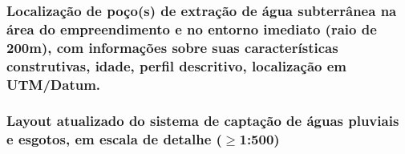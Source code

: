\subsubsection{Localização de poço(s) de extração de água subterrânea na 
área do empreendimento e no entorno imediato (raio de 
200m), com informações sobre suas características 
construtivas, idade, perfil descritivo, localização em 
UTM/Datum.}

\subsubsection{Layout atualizado do sistema de captação de águas 
pluviais e esgotos, em escala de detalhe ($\geq$1:500)}